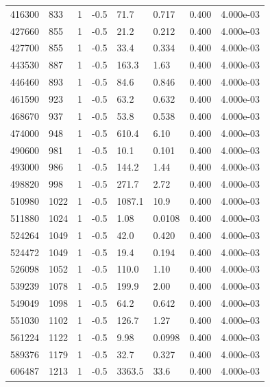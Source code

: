 \documentclass[preview]{standalone}
\begin{document}
{{{{{{\begin{tabular}{L{1.2cm}C{1.2cm} C{0.3cm}C{0.5cm} C{1.4cm}C{1.4cm} C{1.4cm}C{1.4cm}}
  416300  &   833  & 1     & -0.5 &  71.7  & 0.717  & 0.400 &  4.000e-03   \\ 
  427660  &   855  & 1     & -0.5 &  21.2  & 0.212  & 0.400 &  4.000e-03   \\ 
  427700  &   855  & 1     & -0.5 &  33.4  & 0.334  & 0.400 &  4.000e-03   \\ 
  443530  &   887  & 1     & -0.5 &  163.3  & 1.63  & 0.400 &  4.000e-03   \\ 
  446460  &   893  & 1     & -0.5 &  84.6  & 0.846  & 0.400 &  4.000e-03   \\ 
  461590  &   923  & 1     & -0.5 &  63.2  & 0.632  & 0.400 &  4.000e-03   \\ 
  468670  &   937  & 1     & -0.5 &  53.8  & 0.538  & 0.400 &  4.000e-03   \\ 
  474000  &   948  & 1     & -0.5 &  610.4  & 6.10  & 0.400 &  4.000e-03   \\ 
  490600  &   981  & 1     & -0.5 &  10.1  & 0.101  & 0.400 &  4.000e-03   \\ 
  493000  &   986  & 1     & -0.5 &  144.2  & 1.44  & 0.400 &  4.000e-03   \\ 
  498820  &   998  & 1     & -0.5 &  271.7  & 2.72  & 0.400 &  4.000e-03   \\ 
  510980  &  1022  & 1     & -0.5 &  1087.1  & 10.9  & 0.400 &  4.000e-03   \\ 
  511880  &  1024  & 1     & -0.5 &  1.08  & 0.0108  & 0.400 &  4.000e-03   \\ 
  524264  &  1049  & 1     & -0.5 &  42.0  & 0.420  & 0.400 &  4.000e-03   \\ 
  524472  &  1049  & 1     & -0.5 &  19.4  & 0.194  & 0.400 &  4.000e-03   \\ 
  526098  &  1052  & 1     & -0.5 &  110.0  & 1.10  & 0.400 &  4.000e-03   \\ 
  539239  &  1078  & 1     & -0.5 &  199.9  & 2.00  & 0.400 &  4.000e-03   \\ 
  549049  &  1098  & 1     & -0.5 &  64.2  & 0.642  & 0.400 &  4.000e-03   \\ 
  551030  &  1102  & 1     & -0.5 &  126.7  & 1.27  & 0.400 &  4.000e-03   \\ 
  561224  &  1122  & 1     & -0.5 &  9.98  & 0.0998  & 0.400 &  4.000e-03   \\ 
  589376  &  1179  & 1     & -0.5 &  32.7  & 0.327  & 0.400 &  4.000e-03   \\ 
  606487  &  1213  & 1     & -0.5 &  3363.5  & 33.6  & 0.400 &  4.000e-03   \\ 

\end{tabular}}}}}}}
\end{document}
